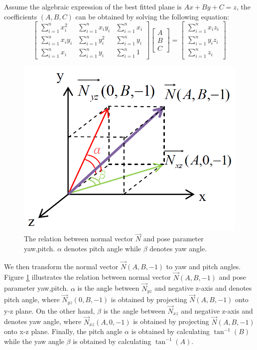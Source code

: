 Assume the algebraic expression of the best fitted plane is $Ax+By+C=z$, the coefficients $(A,B,C)$ can be obtained by solving the following equation:
\begin{equation}
\begin{bmatrix}
\sum_{i=1}^{n}{x_{i}^2} 	& \sum_{i=1}^{n}{x_{i}y_{i}}	& \sum_{i=1}^{n}{x_{i}}	\\
\sum_{i=1}^{n}{x_{i}y_{i}} 	& \sum_{i=1}^{n}{y_{i}^2}		& \sum_{i=1}^{n}{y_{i}}	\\
\sum_{i=1}^{n}{x_{i}} 		& \sum_{i=1}^{n}{y_{i}}			& \sum_{i=1}^{n}{1}	
\end{bmatrix}
\begin{bmatrix}
A	\\
B	\\
C
\end{bmatrix}
=
\begin{bmatrix}
\sum_{i=1}^{n}{x_{i}z_{i}}	\\
\sum_{i=1}^{n}{y_{i}z_{i}}	\\
\sum_{i=1}^{n}{z_{i}}
\end{bmatrix}
\end{equation}

\begin{figure}
\centering
\includegraphics[width=0.5\linewidth]{./figure/vec2angle.png}
\caption{The relation between normal vector $\vec{N}$ and pose parameter {yaw,pitch}. $\alpha$ denotes pitch angle while $\beta$ denotes yaw angle.}
\label{f:vec2angle}       %
\end{figure}

We then transform the normal vector $\vec{N}(A,B,-1)$ to yaw and pitch angles. Figure \ref{f:vec2angle} illustrates the relation between normal vector $\vec{N}(A,B,-1)$ and pose parameter {yaw,pitch}. $\alpha$ is the angle between $\vec{N}_{yz}$ and negative z-axis and denotes pitch angle, where $\vec{N}_{yz}(0,B,-1)$ is obtained by projecting $\vec{N}(A,B,-1)$ onto y-z plane. On the other hand, $\beta$ is the angle between $\vec{N}_{xz}$ and negative z-axis and denotes yaw angle, where $\vec{N}_{xz}(A,0,-1)$ is obtained by projecting $\vec{N}(A,B,-1)$ onto x-z plane. Finally, the pitch angle $\alpha$ is obtained by calculating $\tan^{-1}{(B)}$ while the yaw angle $\beta$ is obtained by calculating $\tan^{-1}{(A)}$.

